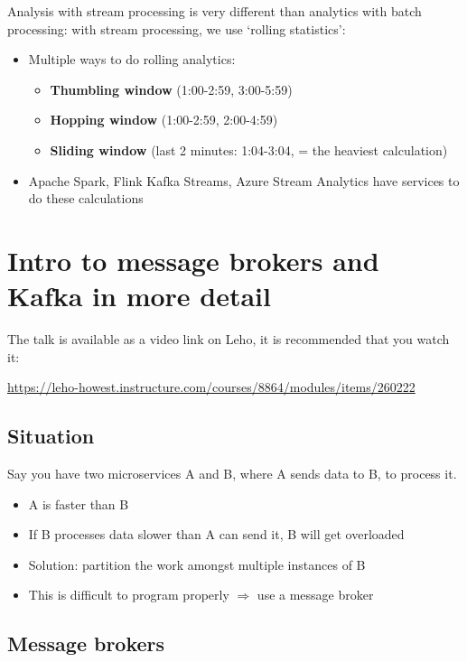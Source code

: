 \documentclass{article}
\begin{document}
Analysis with stream processing is very different than analytics with batch processing: 
with stream processing, we use `rolling statistics':

\begin{itemize}
    \item Multiple ways to do rolling analytics:
    \begin{itemize}
        \item \textbf{Thumbling window} (1:00-2:59, 3:00-5:59)
        \item \textbf{Hopping window} (1:00-2:59, 2:00-4:59)
        \item \textbf{Sliding window} (last 2 minutes: 1:04-3:04, = the heaviest calculation)
    \end{itemize}
    \item Apache Spark, Flink Kafka Streams, Azure Stream Analytics have services to do these calculations
\end{itemize}

\section{Intro to message brokers and Kafka in more detail}

The talk is available as a video link on Leho, it is recommended that you watch it:

\url{https://leho-howest.instructure.com/courses/8864/modules/items/260222}

\subsection{Situation}

Say you have two microservices A and B, where A sends data to B, to process it.

\begin{itemize}
    \item A is faster than B
    \item If B processes data slower than A can send it, B will get overloaded
    \item Solution: partition the work amongst multiple instances of B
    \item This is difficult to program properly $\Rightarrow$ use a message broker 
\end{itemize}

\subsection{Message brokers}
\end{document}
